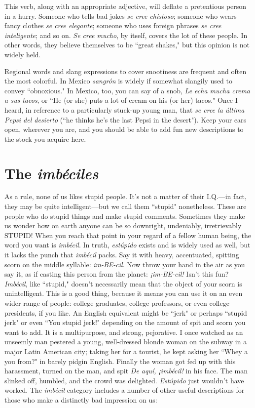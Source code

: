 This verb, along with an appropriate adjective, will
deflate a pretentious person in a hurry. Someone who tells bad jokes
\emph{se cree chistoso}; someone who wears fancy clothes \emph{se cree elegante};
someone who uses foreign phrases \emph{se cree inteligente}; and so on. \emph{Se
cree mucho}, by itself, covers the lot of these people. In other words,
they believe themselves to be ``great shakes," but this opinion is not
widely held.

\bsk

Regional words and slang expressions to cover snootiness are
frequent and often the most colorful. In Mexico \emph{sangrón} is widely if
somewhat slangily used to convey ``obnoxious." In Mexico, too, you
can say of a snob, \emph{Le echa mucha crema a sus tacos}, or ``He (or she)
puts a lot of cream on his (or her) tacos." Once I heard, in reference to
a particularly stuck-up young man, that \emph{se cree la última Pepsi del
desierto} (``he thinks he's the last Pepsi in the desert"). Keep your ears
open, wherever you are, and you should be able to add fun new descriptions to the stock you acquire here.

\section{The \emph{imbéciles}}

As a rule, none of us likes stupid people. It's not a matter of
their I.Q.---in fact, they may be quite intelligent---but we call them
``stupid" nonetheless. These are people who do stupid things and make
stupid comments. Sometimes they make us wonder how on earth anyone can be so downright, undeniably, irretrievably STUPID!
When you reach that point in your regard of a fellow human
being, the word you want is \emph{imbécil}. In truth, \emph{estúpido} exists and is
widely used as well, but it lacks the punch that \emph{imbécil} packs. Say it
with heavy, accentuated, spitting scorn on the middle syllable: \emph{im-BE-cil}. Now throw your hand in the air as you say it, as if casting this
person from the planet: \emph{¡im-BE-cil!} Isn't this fun?
\emph{Imbécil}, like ``stupid," doesn't necessarily mean that the object of your scorn is unintelligent. This is a good thing, because it
means you can use it on an even wider range of people: college graduates, college professors, or even college presidents, if you like. An English equivalent might be ``jerk" or perhaps ``stupid jerk" or even ``You
stupid jerk!" depending on the amount of spit and scorn you want to
add. It is a multipurpose, and strong, pejorative. I once watched as an
unseemly man pestered a young, well-dressed blonde woman on the
subway in a major Latin American city; taking her for a tourist, he
kept asking her ``Whey a you from?" in barely pidgin English. Finally
the woman got fed up with this harassment, turned on the man, and
spit \emph{De aquí, ¡imbécil!} in his face. The man slinked off, humbled, and
the crowd was delighted. \emph{Estúpido} just wouldn't have worked.
The \emph{imbécil} category includes a number of other useful descriptions for those who make a distinctly bad impression on us:

